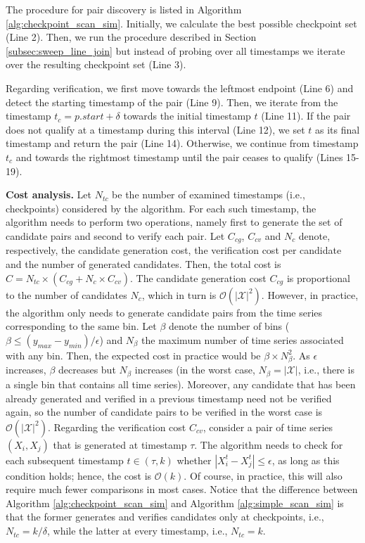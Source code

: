 The procedure for pair discovery is listed in Algorithm \ref{alg:checkpoint_scan_sim}. Initially, we calculate the best possible checkpoint set (Line 2). Then, we run the procedure described in Section \ref{subsec:sweep_line_join} but instead of probing over all timestamps we iterate over the resulting checkpoint set (Line 3).

Regarding verification, we first move towards the leftmost endpoint (Line 6) and detect the starting timestamp of the pair (Line 9). Then, we iterate from the timestamp $t_c = p.start + \delta$ towards the initial timestamp $t$ (Line 11). If the pair does not qualify at a timestamp during this interval (Line 12), we set $t$ as its final timestamp and return the pair (Line 14). Otherwise, we continue from timestamp $t_c$ and towards the rightmost timestamp until the pair ceases to qualify (Lines 15-19).

\textbf{Cost analysis.} Let $N_{tc}$ be the number of examined timestamps (i.e., checkpoints) considered by the algorithm. For each such timestamp, the algorithm needs to perform two operations, namely first to generate the set of candidate pairs and second to verify each pair. Let $C_{cg}$, $C_{cv}$ and $N_c$ denote, respectively, the candidate generation cost, the verification cost per candidate and the number of generated candidates. Then, the total cost is $C = N_{tc} \times (C_{cg} + N_c \times C_{cv})$. The candidate generation cost $C_{cg}$ is proportional to the number of candidates $N_c$, which in turn is $\mathcal{O}(|\mathcal{X}|^2)$. However, in practice, the algorithm only needs to generate candidate pairs from the time series corresponding to the same bin. Let $\beta$ denote the number of bins ($\beta \leq (y_{max} - y_{min}) / \epsilon$) and $N_{\beta}$ the maximum number of time series associated with any bin. Then, the expected cost in practice would be $\beta \times N_{\beta}^2$. As $\epsilon$ increases, $\beta$ decreases but $N_{\beta}$ increases (in the worst case, $N_{\beta} = |\mathcal{X}|$, i.e., there is a single bin that contains all time series). Moreover, any candidate that has been already generated and verified in a previous timestamp need not be verified again, so the number of candidate pairs to be verified in the worst case is $\mathcal{O}(|\mathcal{X}|^2)$. Regarding the verification cost $C_{cv}$, consider a pair of time series $(X_i, X_j)$ that is generated at timestamp $\tau$. The algorithm needs to check for each subsequent timestamp $t \in (\tau, k)$ whether $|X_i^{t} - X_j^{t}| \leq \epsilon$, as long as this condition holds; hence, the cost is $\mathcal{O}(k)$. Of course, in practice, this will also require much fewer comparisons in most cases. Notice that the difference between Algorithm \ref{alg:checkpoint_scan_sim} and Algorithm \ref{alg:simple_scan_sim} is that the former generates and verifies candidates only at checkpoints, i.e., $N_{tc} = k / \delta$, while the latter at every timestamp, i.e., $N_{tc} = k$.

